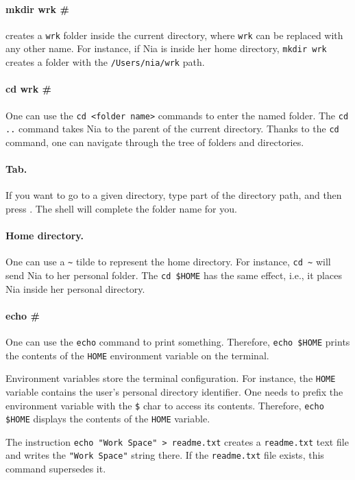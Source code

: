 \documentclass[a4paper,12pt,openany]{book}
\begin{document}
\paragraph{mkdir wrk \#}
creates a \verb|wrk|
folder inside the current directory,
where \verb|wrk| can be replaced
with any other name.
For instance, if Nia is inside her
home directory, \verb|mkdir wrk| creates
a folder with the \verb|/Users/nia/wrk| path.

\paragraph{cd wrk \#} 
One can use the
\verb|cd <folder name>| commands to enter
the named folder.
The \verb|cd ..|  command
takes Nia to the parent of the current
directory.
Thanks to the \verb|cd|
command, one can navigate through the
tree of folders and directories.

\paragraph{Tab.} If you want to go
to a given directory, type part of the directory
path, and then press .
The shell will complete the folder name for you.

\paragraph{Home directory.} One
can use a \verb|~| tilde to represent
the home directory. For instance,
\verb|cd ~| will send Nia to her
personal folder. The \verb|cd $HOME| has
the same effect, i.e., it places Nia inside
her personal directory.

\paragraph{echo \#} One can use the
\verb|echo| command to print something.
Therefore, \verb|echo $HOME| prints
the contents of the \verb|HOME|
environment variable on the terminal.

Environment variables store
the terminal configuration. For instance,
the \verb|HOME| variable contains
the user's personal directory identifier.
One needs to prefix the environment
variable with the \verb|$| char
to access its contents. Therefore,
\verb|echo $HOME| displays the
contents of the \verb|HOME| variable.

The instruction \verb|echo "Work Space" > readme.txt|
creates a \verb|readme.txt| text file and
writes the \verb|"Work Space"| string there.
If the \verb|readme.txt| file exists,
this command supersedes it.
\end{document}
